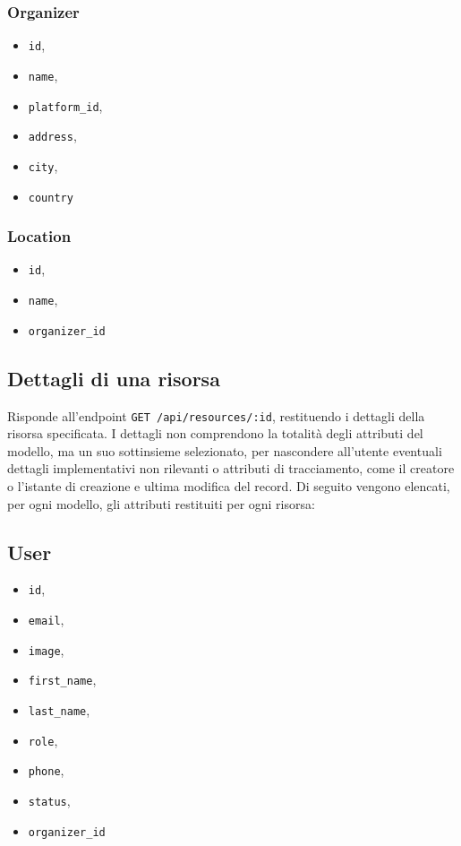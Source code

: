 \subsubsection{Organizer}
\begin{itemize}
	\item \verb|id|,
	\item \verb|name|,
	\item \verb|platform_id|,
	\item \verb|address|,
	\item \verb|city|,
	\item \verb|country|
\end{itemize}

\subsubsection{Location}
\begin{itemize}
	\item \verb|id|,
	\item \verb|name|,
	\item \verb|organizer_id|
\end{itemize}

\subsection{Dettagli di una risorsa}
Risponde all'endpoint \verb|GET /api/resources/:id|, restituendo i dettagli della risorsa specificata. I dettagli non comprendono la totalità degli attributi del modello, ma un suo sottinsieme selezionato, per nascondere all'utente eventuali dettagli implementativi non rilevanti o attributi di tracciamento, come il creatore o l'istante di creazione e ultima modifica del record. Di seguito vengono elencati, per ogni modello, gli attributi restituiti per ogni risorsa:

\subsection{User}
\begin{itemize}
	\item \verb|id|,
	\item \verb|email|,
	\item \verb|image|,
	\item \verb|first_name|,
	\item \verb|last_name|,
	\item \verb|role|,
	\item \verb|phone|,
	\item \verb|status|,
	\item \verb|organizer_id|
\end{itemize}

